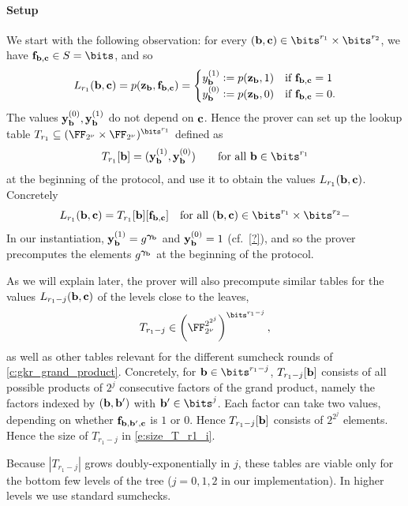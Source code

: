 \documentclass[11pt,letterpaper,usenames,dvipsnames]{article}
\begin{document}
\paragraph{Setup} We start with the following observation: for every $(\bb,\cc)\in \bits^{r_1} \times \bits^{r_2}$, we have $\bff_{\bb,\cc}\in S=\bits$, and so 
%
$$L_{r_1}(\mathbf{b},\mathbf{c})=p(\mathbf{z}_{\mathbf{b}}, \mathbf{f}_{\mathbf{b},\mathbf{c}})= 
\begin{cases}
    y_{\mathbf{b}}^{(1)}{\;\vcentcolon=\;} p(\mathbf{z}_{\mathbf{b}},1) & \text{if } \mathbf{f}_{\mathbf{b},\mathbf{c}}=1\\
     y_{\mathbf{b}}^{(0)}{\;\vcentcolon=\;} p(\mathbf{z}_{\mathbf{b}},0) & \text{if } \mathbf{f}_{\mathbf{b},\mathbf{c}}=0.
\end{cases}$$
%
The values $\mathbf{y}_{\mathbf{b}}^{(0)}, \mathbf{y}_{\mathbf{b}}^{(1)}$   do not depend on $\mathbf{c}$. Hence the prover can set up the lookup table $T_{r_1}\subseteq (\comfield\times \comfield)^{\bits^{r_1}}$ defined as
%
$$
T_{r_1}[\bb]= (\yy_{\bb}^{(1)}, \yy_{\bb}^{(0)}) \qquad \text{for all } \bb \in \bits^{r_1}
$$
at the beginning of the protocol, and use it to obtain the values $L_{r_1}(\mathbf{b},\mathbf{c})$. Concretely
%
$$
L_{r_1}(\bb,\cc)=T_{r_1}[\bb][\bff_{\bb,\cc}] \quad \text{for all } (\bb,\cc)\in \bits^{r_1}\times \bits^{r_2}-
$$
In our instantiation, $\mathbf{y}_{\mathbf{b}}^{(1)}=g^{\bm{\gamma}_{\mathbf{b}}}$ and $\mathbf{y}_{\mathbf{b}}^{(0)}=1$ (cf.\ \cref{?}), and so the prover precomputes the elements $g^{\bm{\gamma}_{\mathbf{b}}}$ at the beginning of the protocol. 


As we will explain later, the prover will also precompute similar tables for the values $L_{r_1-j}(\mathbf{b},\mathbf{c})$ of the levels close to the leaves,
\begin{equation}\label{e:size_T_r1_i}T_{r_1-j}\in \left(\comfield^{2^{2^j}}\right)^{\bits^{r_1-j}},\end{equation}
as well as other tables relevant for the different sumcheck rounds of \cref{c:gkr_grand_product}. Concretely, for $\bb\in \bits^{r_1-j}$, $T_{r_1-j}[\mathbf{b}]$ consists of all possible products of  $2^j$ consecutive factors of the grand product, namely the factors indexed by $(\mathbf{b}, \mathbf{b}')$ with $\bb'\in \bits^{j}$.  Each factor can take two values, depending on whether $\mathbf{f}_{\mathbf{b},\mathbf{b}', \mathbf{c}}$ is $1$ or $0$. Hence $T_{r_1-j}[\mathbf{b}]$ consists of $2^{2^j}$ elements. Hence the size of $T_{r_1-j}$ in \eqref{e:size_T_r1_i}.

Because $|T_{r_1-j}|$   grows doubly-exponentially in $j$, these tables are viable only for the bottom few levels of the tree ($j=0,1,2$ in our implementation). In higher levels we use standard sumchecks.
\end{document}
